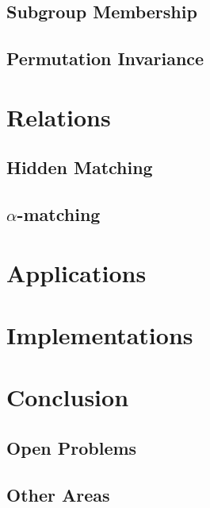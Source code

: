 \documentclass[a4paper]{article}
\begin{document}
        \subsection{Subgroup Membership}

        \subsection{Permutation Invariance}

    \section{Relations}

        \subsection{Hidden Matching}

        \subsection{$\alpha$-matching}

    \section{Applications}

    \section{Implementations}

    \section{Conclusion}

        \subsection{Open Problems}

        \subsection{Other Areas}
\end{document}
